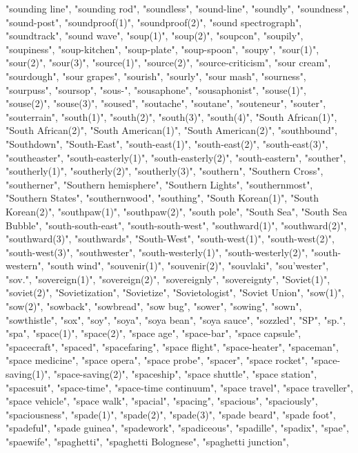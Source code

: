 "sounding line",
"sounding rod",
"soundless",
"sound-line",
"soundly",
"soundness",
"sound-post",
"soundproof(1)",
"soundproof(2)",
"sound spectrograph",
"soundtrack",
"sound wave",
"soup(1)",
"soup(2)",
"soupcon",
"soupily",
"soupiness",
"soup-kitchen",
"soup-plate",
"soup-spoon",
"soupy",
"sour(1)",
"sour(2)",
"sour(3)",
"source(1)",
"source(2)",
"source-criticism",
"sour cream",
"sourdough",
"sour grapes",
"sourish",
"sourly",
"sour mash",
"sourness",
"sourpuss",
"soursop",
"sous-",
"sousaphone",
"sousaphonist",
"souse(1)",
"souse(2)",
"souse(3)",
"soused",
"soutache",
"soutane",
"souteneur",
"souter",
"souterrain",
"south(1)",
"south(2)",
"south(3)",
"south(4)",
"South African(1)",
"South African(2)",
"South American(1)",
"South American(2)",
"southbound",
"Southdown",
"South-East",
"south-east(1)",
"south-east(2)",
"south-east(3)",
"southeaster",
"south-easterly(1)",
"south-easterly(2)",
"south-eastern",
"souther",
"southerly(1)",
"southerly(2)",
"southerly(3)",
"southern",
"Southern Cross",
"southerner",
"Southern hemisphere",
"Southern Lights",
"southernmost",
"Southern States",
"southernwood",
"southing",
"South Korean(1)",
"South Korean(2)",
"southpaw(1)",
"southpaw(2)",
"south pole",
"South Sea",
"South Sea Bubble",
"south-south-east",
"south-south-west",
"southward(1)",
"southward(2)",
"southward(3)",
"southwards",
"South-West",
"south-west(1)",
"south-west(2)",
"south-west(3)",
"southwester",
"south-westerly(1)",
"south-westerly(2)",
"south-western",
"south wind",
"souvenir(1)",
"souvenir(2)",
"souvlaki",
"sou'wester",
"sov.",
"sovereign(1)",
"sovereign(2)",
"sovereignly",
"sovereignty",
"Soviet(1)",
"soviet(2)",
"Sovietization",
"Sovietize",
"Sovietologist",
"Soviet Union",
"sow(1)",
"sow(2)",
"sowback",
"sowbread",
"sow bug",
"sower",
"sowing",
"sown",
"sowthistle",
"sox",
"soy",
"soya",
"soya bean",
"soya sauce",
"sozzled",
"SP",
"sp.",
"spa",
"space(1)",
"space(2)",
"space age",
"space-bar",
"space capsule",
"spacecraft",
"spaced",
"spacefaring",
"space flight",
"space-heater",
"spaceman",
"space medicine",
"space opera",
"space probe",
"spacer",
"space rocket",
"space-saving(1)",
"space-saving(2)",
"spaceship",
"space shuttle",
"space station",
"spacesuit",
"space-time",
"space-time continuum",
"space travel",
"space traveller",
"space vehicle",
"space walk",
"spacial",
"spacing",
"spacious",
"spaciously",
"spaciousness",
"spade(1)",
"spade(2)",
"spade(3)",
"spade beard",
"spade foot",
"spadeful",
"spade guinea",
"spadework",
"spadiceous",
"spadille",
"spadix",
"spae",
"spaewife",
"spaghetti",
"spaghetti Bolognese",
"spaghetti junction",
